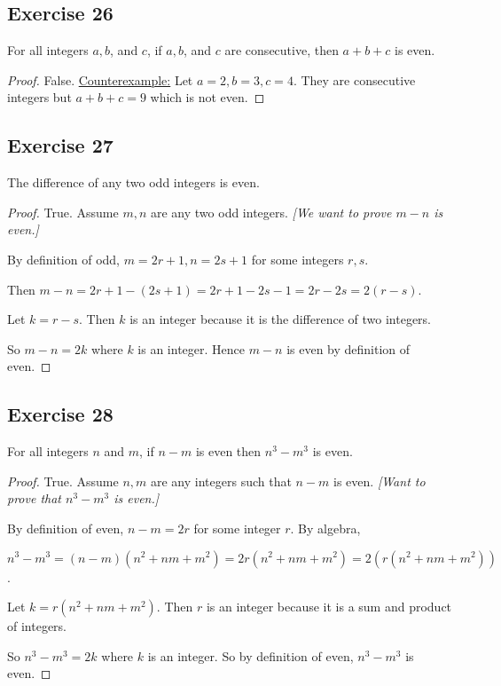 \documentclass[14pt]{extarticle}
\begin{document}
\subsection{Exercise 26}
For all integers $a, b$, and $c$, if $a, b$, and $c$ are consecutive, then $a + b + c$ is even.

\begin{proof}
    False. \underline{Counterexample:} Let $a = 2, b = 3, c = 4$. They are consecutive integers but $a+b+c = 9$ which is not even.
\end{proof}

\subsection{Exercise 27}
The difference of any two odd integers is even.

\begin{proof}
    True. Assume $m, n$ are any two odd integers. {\it [We want to prove $m - n$ is even.]}

    By definition of odd, $m = 2r+1, n = 2s+1$ for some integers $r,s$.

    Then $m-n = 2r+1 - (2s+1) = 2r+1 - 2s - 1 = 2r - 2s = 2(r-s)$.

    Let $k = r-s$. Then $k$ is an integer because it is the difference of two integers.

    So $m-n = 2k$ where $k$ is an integer. Hence $m-n$ is even by definition of even.
\end{proof}

\subsection{Exercise 28}
For all integers $n$ and $m$, if $n - m$ is even then $n^3 - m^3$ is even.

\begin{proof}
    True. Assume $n, m$ are any integers such that $n - m$ is even. {\it [Want to prove that $n^3 - m^3$ is even.]}

    By definition of even, $n-m = 2r$ for some integer $r$. By algebra,

    $n^3 - m^3 = (n-m)(n^2 + nm + m^2) = 2r(n^2 + nm + m^2) = 2(r(n^2 + nm + m^2))$.

    Let $k = r(n^2 + nm + m^2)$. Then $r$ is an integer because it is a sum and product of integers.

    So $n^3 - m^3 = 2k$ where $k$ is an integer. So by definition of even, $n^3 - m^3$ is even.
\end{proof}
\end{document}
